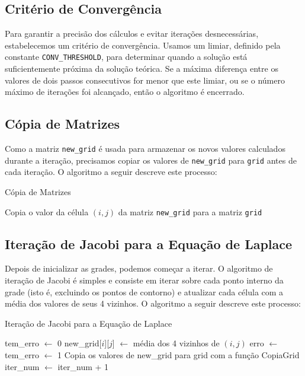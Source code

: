 \documentclass[conference]{IEEEtran}
\begin{document}
\subsection{Critério de Convergência}

Para garantir a precisão dos cálculos e evitar iterações desnecessárias, estabelecemos um critério de convergência. Usamos um limiar, definido pela constante \texttt{CONV\_THRESHOLD}, para determinar quando a solução está suficientemente próxima da solução teórica. Se a máxima diferença entre os valores de dois passos consecutivos for menor que este limiar, ou se o número máximo de iterações foi alcançado, então o algoritmo é encerrado.


\subsection {Cópia de Matrizes}

Como a matriz \texttt{new\_grid} é usada para armazenar os novos valores calculados durante a iteração, precisamos copiar os valores de \texttt{new\_grid} para \texttt{grid} antes de cada iteração. O algoritmo a seguir descreve este processo:

\begin{algorithm}[H]
    \caption{Cópia de Matrizes}
    \begin{algorithmic}[1]
        \State Copia o valor da célula $(i, j)$ da matriz \texttt{new\_grid} para a matriz \texttt{grid}
        \EndFor
        \EndFunction
    \end{algorithmic}
\end{algorithm}

\subsection{Iteração de Jacobi para a Equação de Laplace}

Depois de inicializar as grades, podemos começar a iterar. O algoritmo de iteração de Jacobi é simples e consiste em iterar sobre cada ponto interno da grade (isto é, excluindo os pontos de contorno) e atualizar cada célula com a média dos valores de seus 4 vizinhos. O algoritmo a seguir descreve este processo:

\begin{algorithm}[H]
    \caption{Iteração de Jacobi para a Equação de Laplace}
    \begin{algorithmic}[1]
        \State tem\_erro $\gets$ 0
        \State new\_grid[$i$][$j$] $\gets$ média dos 4 vizinhos de $(i, j)$
        \State erro $\gets$ 
        \State tem\_erro $\gets$ 1
        \EndIf
        \EndFor
        \State Copia os valores de new\_grid para grid com a função CopiaGrid
        \State iter\_num $\gets$ iter\_num + 1
        \EndWhile
    \end{algorithmic}
\end{algorithm}
\end{document}
